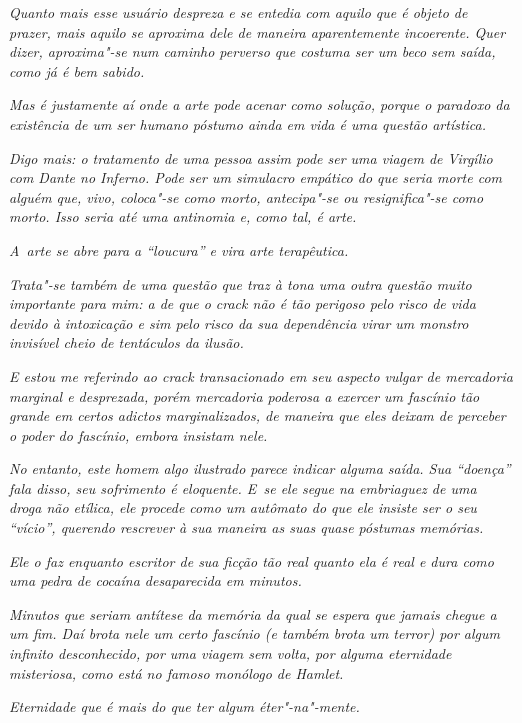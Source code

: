 \emph{Quanto mais esse usuário despreza e se entedia com aquilo que é
objeto de prazer, mais aquilo se aproxima dele de maneira aparentemente
incoerente. Quer dizer, aproxima"-se num caminho perverso que costuma ser
um beco sem saída, como já é bem sabido.}~

\emph{Mas é justamente aí onde a arte pode acenar como solução, porque o
paradoxo da existência de um ser humano póstumo ainda em vida é uma
questão artística.}~

\emph{Digo mais: o tratamento de uma pessoa assim pode ser uma viagem de
Virgílio com Dante no Inferno. Pode ser um simulacro empático do que
seria morte com alguém que, vivo, coloca"-se como morto, antecipa"-se ou
resignifica"-se como morto. Isso seria até uma antinomia e, como tal, é
arte.}~

\emph{A~arte se abre para a ``loucura'' e vira arte terapêutica.}~

\emph{Trata"-se também de uma questão que traz à tona uma outra questão
muito importante para mim: a de que o crack não é tão perigoso pelo
risco de vida devido à intoxicação e sim pelo risco da sua dependência
virar um monstro invisível cheio de tentáculos da ilusão.}~

\emph{E estou me referindo ao crack transacionado em seu aspecto vulgar
de mercadoria marginal e desprezada, porém mercadoria poderosa a exercer
um fascínio tão grande em certos adictos marginalizados, de maneira que
eles deixam de perceber o poder do fascínio, embora insistam nele.}~

\emph{No entanto, este homem algo ilustrado parece indicar alguma saída.
Sua ``doença'' fala disso, seu sofrimento é eloquente. E~se ele segue na
embriaguez de uma droga não etílica, ele procede como um autômato do que
ele insiste ser o seu ``vício'', querendo rescrever à sua maneira as
suas quase póstumas memórias.}~

\emph{Ele o faz enquanto escritor de sua ficção tão real quanto ela é
real e dura como uma pedra de cocaína desaparecida em minutos.}~

\emph{Minutos que seriam antítese da memória da qual se espera que
jamais chegue a um fim. Daí brota nele um certo fascínio (e também brota
um terror) por algum infinito desconhecido, por uma viagem sem volta,
por alguma eternidade misteriosa, como está no famoso monólogo de
Hamlet.}~

\emph{Eternidade que é mais do que ter algum éter"-na"-mente.}
\endgroup